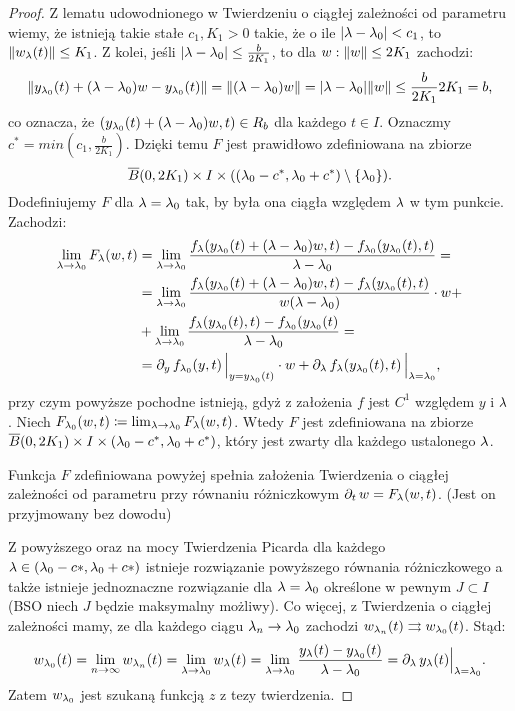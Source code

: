 \begin{proof}
		Z lematu udowodnionego w Twierdzeniu o ciągłej zależności od parametru wiemy, że istnieją takie stałe $c_1, K_1 > 0$ takie, że o ile $\abs{ \l - \l_0 } < c_1$, to $\norm{ w_\l(t) } \le K_1$. Z kolei, jeśli $\abs{ \l - \l_0 } \le \frac{ b }{ 2K_1 }$, 
		to dla $w : \lVert w \rVert \le 2K_1$ zachodzi:
		\begin{equation*}
		\norm{ y_{\l_0}(t) + (\l - \l_0)w - y_{\l_0}(t) } = \norm { (\l - \l_0)w  } = \abs{ \l - \l_0 } \norm{ w } \le
		\frac{ b }{ 2K_1 } 2K_1 = b \text{,}
		\end{equation*}
		co oznacza, że $( y_{\l_0}(t) + (\l - \l_0)w, t) \in R_b$ dla każdego $t \in I$. Oznaczmy $c^* = min(c_1, \frac{ b }{ 2K_1 } )$. Dzięki temu $F$ jest prawidłowo zdefiniowana na zbiorze
		\begin{equation*}
		\overline{B}(0, 2K_1) \times I \times ( (\l_0 - c^*, \l_0 + c^*) \setminus \{ \l_0 \} ) \text{.}
		\end{equation*}
		Dodefiniujemy $F$ dla $\l = \l_0$ tak, by była ona ciągła względem $\l$ w tym punkcie. Zachodzi:
		\begin{align*}
		\lim_{\l \to \l_0} F_\l(w, t) &= \lim_{\l \to \l_0} \frac{ f_\l(y_{\l_0}(t) + (\l - \l_0)w, t) -  f_{\l_0}(y_{\l_0}(t), t) }{ \l - \l_0 } = \\
		&=  \lim_{\l \to \l_0} \frac{ f_\l(y_{\l_0}(t) + (\l - \l_0)w, t) -  f_\l (y_{\l_0}(t), t) }{ w(\l - \l_0) } \cdot w + \\
		&+ \lim_{\l \to \l_0} \frac{ f_\l(y_{\l_0}(t), t) -  f_{\l_0}(y_{\l_0}(t) }{ \l - \l_0 } = \\
		&= \pd{ y } f_{\l_0} (y, t) \, \Big\vert_{ y = y_{\l_0}(t) } \cdot w + \pd{ \l } f_{\l}( y_{\l_0}(t), t) \, \Big\vert_{ \l = \l_0 } \text{,}
		\end{align*}
		przy czym powyższe pochodne istnieją, gdyż z założenia $f$ jest $C^1$ względem $y$ i $\l$. Niech $F_{\l_0}(w, t) \coloneqq \lim_{\l \to \l_0} F_\l(w, t)$. Wtedy $F$ jest zdefiniowana na zbiorze $\overline{B}(0, 2K_1) \times I \times (\l_0 - c^*, \l_0 + c^*)$, który jest zwarty dla każdego ustalonego $\l$.
		\begin{nestedlemma}
			Funkcja $F$ zdefiniowana powyżej spełnia założenia Twierdzenia o ciągłej zależności od parametru przy równaniu 
			różniczkowym $\pd{t} w = F_\l(w, t)$. (Jest on przyjmowany bez dowodu)
		\end{nestedlemma}		
		Z powyższego oraz na mocy Twierdzenia Picarda dla każdego $\l \in  (\l_0 - c*, \l_0 + c*)$ istnieje rozwiązanie
		powyższego równania różniczkowego a także istnieje jednoznaczne rozwiązanie dla $\l = \l_0$ określone
		w pewnym $J \subset I$ (BSO niech $J$ będzie maksymalny możliwy). Co więcej, z Twierdzenia
		o ciągłej zależności mamy, ze dla każdego ciągu $\l_n \to \l_0$ zachodzi $w_{\l_n}(t) \rightrightarrows w_{\l_0}(t)$.
		Stąd:
		\begin{equation*}
		w_{\l_0}(t) = \lim_{n \to \infty} w_{\l_n}(t) = \lim_{\l \to \l_0} w_{\l}(t) = \lim_{\l \to \l_0} \frac{ y_\l(t) - y_{\l_0}(t) }{ \l - \l_0 } = \pd{ \l } y_\l(t) \Big\vert_{ \l = \l_0 } \text{.}
		\end{equation*}
		Zatem $w_{\l_0}$ jest szukaną funkcją $z$ z tezy twierdzenia.
		

\end{proof}
